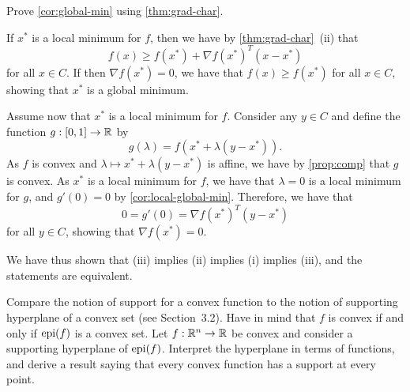 \begin{exercise}
  Prove \cref{cor:global-min} using \cref{thm:grad-char}.
\end{exercise}

\begin{solution}
  If $x^*$ is a local minimum for $f$, then we have by \cref{thm:grad-char}~(ii) that
  \begin{equation}
    f(x) \geq f(x^*) + \nabla f(x^*)^T (x - x^*)
  \end{equation}
  for all $x \in C$.
  If then $\nabla f(x^*) = 0$, we have that $f(x) \geq f(x^*)$ for all $x \in C$, showing that $x^*$ is a global minimum.

  Assume now that $x^*$ is a local minimum for $f$.
  Consider any $y \in C$ and define the function $g : [0, 1] \to \mathbb{R}$ by
  \begin{equation}
    g(\lambda) = f( x^* + \lambda (y - x^*) ).
  \end{equation}
  As $f$ is convex and $\lambda \mapsto x^* + \lambda (y - x^*)$ is affine, we have by \cref{prop:comp} that $g$ is convex.
  As $x^*$ is a local minimum for $f$, we have that $\lambda = 0$ is a local minimum for $g$, and $g'(0) = 0$ by \cref{cor:local-global-min}.
  Therefore, we have that
  \begin{equation}
    0 = g'(0) = \nabla f(x^*)^T (y - x^*)
  \end{equation}
  for all $y \in C$, showing that $\nabla f(x^*) = 0$.

  We have thus shown that (iii) implies (ii) implies (i) implies (iii), and the statements are equivalent.
\end{solution}

\begin{exercise}
  Compare the notion of support for a convex function to the notion of supporting hyperplane of a convex set (see Section~3.2).
  Have in mind that $f$ is convex if and only if $\operatorname*{epi}(f)$ is a convex set.
  Let $f : \mathbb{R}^n \to \mathbb{R}$ be convex and consider a supporting hyperplane of $\operatorname*{epi}(f)$.
  Interpret the hyperplane in terms of functions, and derive a result saying that every convex function has a support at every point.
\end{exercise}
